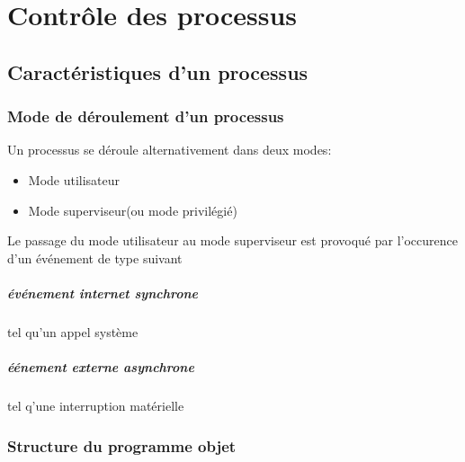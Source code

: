 \documentclass[12pt,a4paper,openany]{report}
\begin{document}
	\maketitle
	\chapter{Contrôle des processus}
	\section{Caractéristiques d'un processus}
		\subsection{Mode de déroulement d'un processus}
		Un processus se déroule alternativement dans deux modes:
		\begin{itemize}
			\item Mode utilisateur
			\item Mode superviseur(ou mode privilégié)
		\end{itemize}
		Le passage du mode utilisateur au mode superviseur est provoqué par l'occurence d'un événement de type suivant
		\paragraph{événement internet synchrone} tel qu'un appel système
		\paragraph{éénement externe asynchrone} tel q'une interruption matérielle
		\subsection{Structure du programme objet}
\end{document}
